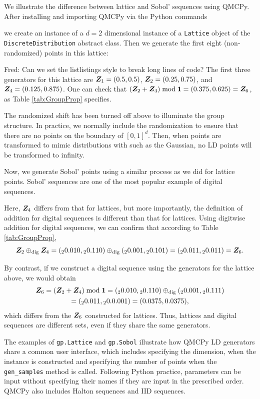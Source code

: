 \documentclass[graybox,footinfo]{svmult}
\newcommand{\FJHComment}[1]{{\color{magenta} Fred: #1}}
\newcommand{\dig}{\textup{dig}}
\begin{document}
We illustrate the difference between lattice and Sobol' sequences using QMCPy.  After installing and importing QMCPy via the Python commands

we create an instance of a $d=2$ dimensional instance of a \texttt{Lattice} object of the  \texttt{DiscreteDistribution} abstract class.  Then we generate the first eight (non-randomized) points in this lattice:

\FJHComment{Can we set the listlistings style to break long lines of code?}
The first three generators for this lattice are ${\boldsymbol{Z}}_1 = (0.5, 0.5)$, ${\boldsymbol{Z}}_2 = (0.25, 0.75)$, and ${\boldsymbol{Z}}_4 = (0.125, 0.875)$.  One can check that $({\boldsymbol{Z}}_2 + {\boldsymbol{Z}}_4) \bmod {\boldsymbol{1}} = (0.375, 0.625) = {\boldsymbol{Z}}_6$, as Table \ref{tab:GroupProp} specifies.

The randomized shift has been turned off above to illuminate the group structure.  In practice, we normally include the randomization to ensure that there are no points on the boundary of $[0,1]^d$.  Then, when points are transformed to mimic distributions with such as the Gaussian, no LD points will be transformed to infinity.

Now, we generate Sobol' points using a similar process as we did for lattice points.  Sobol' sequences are one of the most popular example of digital sequences.

Here, ${\boldsymbol{Z}}_4$ differs from that for lattices, but more importantly, the definition of addition for digital sequences is different than that for lattices.  Using digitwise addition for digital sequences, we can confirm that according to Table \ref{tab:GroupProp},
\[
\bsZ_2 \oplus_{\dig} \bsZ_4 = ({}_20.010,{}_20.110)  \oplus_{\dig} ({}_20.001,{}_20.101) = ({}_20.011,{}_20.011) = \bsZ_6.
\]

By contrast, if we construct a digital sequence using the generators for the lattice above, we would obtain
\begin{multline*}
\bsZ_6 = (\bsZ_2 + \bsZ_4) \bmod \bsone  = ({}_20.010,{}_20.110)  \oplus_{\dig} ({}_20.001,{}_20.111)  \\
= ({}_20.011,{}_20.0.001) = (0.0375, 0.0375),
\end{multline*}
which differs from the ${\boldsymbol{Z}}_6$ constructed for lattices.  Thus, lattices and digital sequences are different sets, even if they share the same generators.

The examples of \texttt{gp.Lattice} and \texttt{gp.Sobol} illustrate how QMCPy LD generators share a common user interface, which includes specifying the dimension, when the instance is constructed and specifying the number of points when the \texttt{gen\_samples} method is called.  Following Python practice, parameters can be input without specifying their names if they are input in the prescribed order.  QMCPy also includes Halton sequences and IID sequences.
\end{document}
